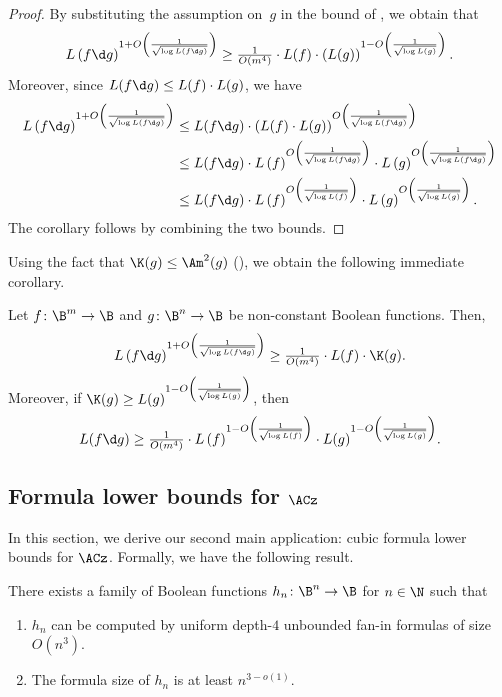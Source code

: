 \begin{proof}
By substituting the assumption on~$g$ in the bound of ,
we obtain that 
\[
L\left(f\d g\right)^{1+O\left(\frac{1}{\sqrt{\log L(f\d g)}}\right)}\geq\tfrac{1}{O(m^{4})}\cdot L(f) \cdot\left(L(g)\right)^{1-O\left(\frac{1}{\sqrt{\log L(g)}}\right)}.
\]
Moreover, since $L(f\d g)\le L(f)\cdot L(g)$, we have 
\begin{align*}
L\left(f\d g\right)^{1+O\left(\frac{1}{\sqrt{\log L(f\d g)}}\right)} & \le L(f\d g)\cdot\left(L(f)\cdot L(g)\right)^{O\left(\frac{1}{\sqrt{\log L(f\d g)}}\right)}\\
 & \le L(f\d g)\cdot L\left(f\right)^{O\left(\frac{1}{\sqrt{\log L(f\d g)}}\right)}\cdot L\left(g\right)^{O\left(\frac{1}{\sqrt{\log L(f\d g)}}\right)}\\
 & \le L(f\d g)\cdot L\left(f\right)^{O\left(\frac{1}{\sqrt{\log L(f)}}\right)}\cdot L\left(g\right)^{O\left(\frac{1}{\sqrt{\log L(g)}}\right)}.
\end{align*}
The corollary follows by combining the two bounds. 
\end{proof}
Using the fact that $\K(g)\le\Am^{2}(g)$ (), we obtain
the following immediate corollary. 
\begin{corollary}
\label{cor:KRW-original-khrapchenko}Let $f\colon\B^{m}\to\B$ and $g\colon\B^{n}\to\B$
be non-constant Boolean functions. Then, 
\[
L\left(f\d g\right)^{1+O\left(\frac{1}{\sqrt{\log L(f\d g)}}\right)}\geq\tfrac{1}{O(m^{4})}\cdot L(f) \cdot\K(g).
\]
Moreover, if $\K(g)\ge L(g)^{1-O\left(\frac{1}{\sqrt{\log L(g)}}\right)}$,
then 
\[
L(f\d g)\ge\tfrac{1}{O(m^{4})}\cdot L\left(f\right)^{1-O\left(\frac{1}{\sqrt{\log L(f)}}\right)}\cdot L(g)^{1-O\left(\frac{1}{\sqrt{\log L(g)}}\right)}.
\]
\end{corollary}


\subsection{\label{subsec:AC0-bounds}Formula lower bounds for \texorpdfstring{$\protect\ACz$}{AC0}}

In this section, we derive our second main application: cubic formula
lower bounds for $\ACz$. Formally, we have the following result.
\begin{restated}{}
There exists a family of Boolean functions $h_{n}\colon\B^{n}\to\B$ for
$n\in\N$ such that 
\begin{enumerate}
\item $h_{n}$ can be computed by uniform depth-$4$ unbounded fan-in formulas
of size $O(n^{3})$. 
\item The formula size of $h_{n}$ is at least $n^{3-o(1)}$.
\end{enumerate}
\end{restated}

